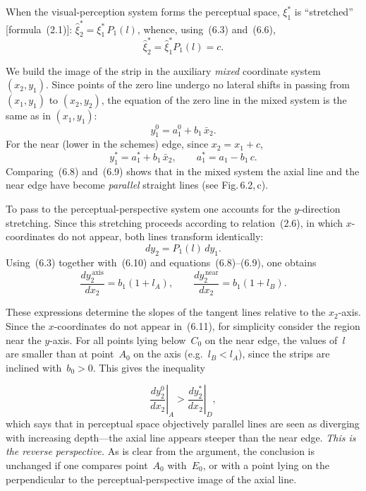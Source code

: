 When the visual-perception system forms the perceptual space, $\xi_1^*$ is ``stretched''
[formula~(2.1)]: $\hat\xi_2^* = \xi_1^*\,P_1(l)$, whence, using~(6.3) and~(6.6),
\begin{equation}
  \hat\xi_2^* = \hat\xi_1^* P_1(l)  = c.  \tag{6.7}
\end{equation}


We build the image of the strip in the auxiliary \emph{mixed} coordinate system $(x_2, y_1)$.
Since points of the zero line undergo no lateral shifts in passing from $(x_1, y_1)$ to
$(x_2, y_2)$, the equation of the zero line in the mixed system is the same as in
$(x_1, y_1)$:
\begin{equation}
  y_1^0 = a_1^0 + b_1\,\bar{x}_2.  \tag{6.8}
\end{equation}
For the near (lower in the schemes) edge, since $x_2 = x_1 + c$,
\begin{equation}
  y_1^* = a_1^* + b_1\,\bar{x}_2, \qquad a_1^* = a_1 - b_1\,c.  \tag{6.9}
\end{equation}
Comparing~(6.8) and~(6.9) shows that in the mixed system the axial line and the near edge
have become \emph{parallel} straight lines (see Fig.\,6.2,\,c).

To pass to the perceptual-perspective system one accounts for the $y$-direction stretching.
Since this stretching proceeds according to relation~(2.6), in which $x$-coordinates do
not appear, both lines transform identically:
\begin{equation}
  dy_2 = P_1(l)\,dy_1.  \tag{6.10}
\end{equation}
Using~(6.3) together with~(6.10) and equations~(6.8)--(6.9), one obtains
\begin{equation}
  \frac{dy_2^{\,\text{axis}}}{dx_2} = b_1(1+l_A),\qquad
  \frac{dy_2^{\,\text{near}}}{dx_2} = b_1(1+l_B).  \tag{6.11}
\end{equation}

These expressions determine the slopes of the tangent lines relative to the $x_2$-axis.
Since the $x$-coordinates do not appear in~(6.11), for simplicity consider the region near
the $y$-axis.  For all points lying below~$C_0$ on the near edge, the values of~$l$
are smaller than at point~$A_0$ on the axis (e.g.\ $l_B < l_A$), since the strips
are inclined with~$b_0 > 0$.  This gives the inequality


\begin{equation}
  \left.\frac{dy_2^0}{dx_2}\right|_A > \left.\frac{dy_2^*}{dx_2}\right|_D,  \tag{6.12}
\end{equation}
which says that in perceptual space objectively parallel lines are seen as diverging with
increasing depth---the axial line appears steeper than the near edge.  \emph{This is the
reverse perspective.}  As is clear from the argument, the conclusion is unchanged if one
compares point~$A_0$ with~$E_0$, or with a point lying on the perpendicular to the
perceptual-perspective image of the axial line.

